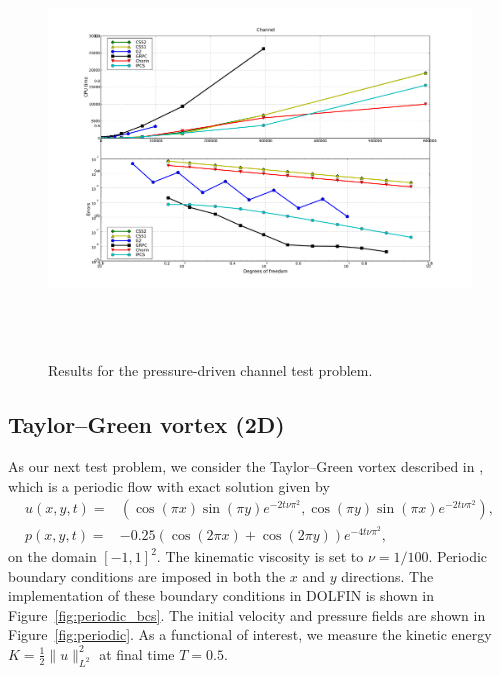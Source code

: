 \begin{figure}
  \vspace{0.2cm}
  \hspace{-2cm}
  \includegraphics[width=20cm,height=11cm,keepaspectratio=false]{chapters/kvs-1/pdf/new_channel_res.pdf}
  \caption{Results for the pressure-driven channel test problem.}
  \label{fig:channel_results}
\end{figure}

\subsection{Taylor--Green vortex (2D)}

As our next test problem, we consider the Taylor--Green vortex
described in \citet{CanutoHussainiQuarteroniEtAl2007}, which is a
periodic flow with exact solution given by
\begin{equation}\label{eq:periodic}
  \begin{split}
    u(x,y,t) = & (\cos (\pi x) \sin (\pi y)  e^{-2t\nu\pi^2}, \cos (\pi y)  \sin (\pi x)  e^{-2t\nu\pi^2}), \\
    p(x,y,t) = & -0.25(\cos(2\pi x ) + \cos(2\pi y ))  e^{-4t\nu\pi^2},
  \end{split}
\end{equation}
on the domain $[-1, 1]^{2}$. The kinematic viscosity is set to $\nu =
1/100$. Periodic boundary conditions are imposed in both the $x$ and
$y$ directions. The implementation of these boundary conditions in
DOLFIN is shown in Figure~\ref{fig:periodic_bcs}. The initial velocity
and pressure fields are shown in Figure~\ref{fig:periodic}. As a
functional of interest, we measure the kinetic energy $K = \frac{1}{2}
\|u\|^2_{L^2}$ at final time $T = 0.5$.

